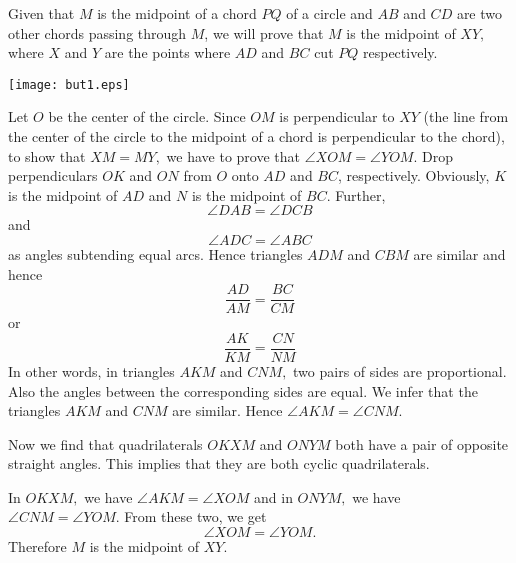 \documentclass[12pt]{article}
\begin{document}
Given that $M$ is the midpoint of a chord $PQ$ of a circle and $AB$ and $CD$ are two other chords passing through $M$, we will prove that $M$ is the midpoint of $XY,$ where $X$ and $Y$ are the points where $AD$ and $BC$ cut $PQ$ respectively.

\begin{center}
\texttt{[image: but1.eps]}
\end{center}

Let $O$ be the center of the circle. Since $OM$ is perpendicular to $XY$ (the line from the center of the circle to the midpoint of a chord is perpendicular to the chord), to show that $XM = MY,$ we have to prove that $\angle XOM = \angle YOM.$
Drop perpendiculars $OK$ and $ON$ from $O$ onto $AD$ and $BC$, respectively.
Obviously, $K$ is the midpoint of $AD$ and $N$ is the midpoint of $BC$. Further,
$$\angle DAB = \angle DCB$$ and $$\angle ADC = \angle ABC$$ as angles subtending equal arcs.
Hence triangles $ADM$ and $CBM$ are similar and hence
$$\frac{AD}{AM} = \frac{BC}{CM}$$   or   $$\frac{AK}{KM} = \frac{CN}{NM}$$
In other words, in triangles $AKM$ and $CNM, $ two pairs of sides are proportional. Also the angles between the corresponding sides are equal. We infer that the triangles $AKM$ and $CNM$ are similar.
Hence $\angle AKM = \angle CNM.$

Now we find that quadrilaterals $OKXM$ and $ONYM$ both have a pair of opposite straight angles.
This implies that they are both cyclic quadrilaterals.

In $OKXM,$ we have $\angle AKM = \angle XOM$ and in $ONYM,$ we have $\angle CNM = \angle YOM.$
From these two, we get $$\angle XOM = \angle YOM.$$
Therefore $M$ is the midpoint of $XY.$
\end{document}
